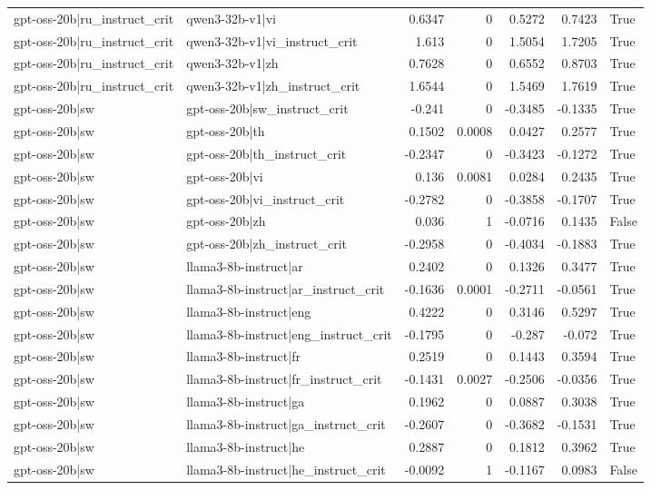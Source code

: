 \begin{table}
\begin{tabular}{l l r r r r l}
gpt-oss-20b|ru_instruct_crit & qwen3-32b-v1|vi & 0.6347 & 0 & 0.5272 & 0.7423 & True \\
gpt-oss-20b|ru_instruct_crit & qwen3-32b-v1|vi_instruct_crit & 1.613 & 0 & 1.5054 & 1.7205 & True \\
gpt-oss-20b|ru_instruct_crit & qwen3-32b-v1|zh & 0.7628 & 0 & 0.6552 & 0.8703 & True \\
gpt-oss-20b|ru_instruct_crit & qwen3-32b-v1|zh_instruct_crit & 1.6544 & 0 & 1.5469 & 1.7619 & True \\
gpt-oss-20b|sw & gpt-oss-20b|sw_instruct_crit & -0.241 & 0 & -0.3485 & -0.1335 & True \\
gpt-oss-20b|sw & gpt-oss-20b|th & 0.1502 & 0.0008 & 0.0427 & 0.2577 & True \\
gpt-oss-20b|sw & gpt-oss-20b|th_instruct_crit & -0.2347 & 0 & -0.3423 & -0.1272 & True \\
gpt-oss-20b|sw & gpt-oss-20b|vi & 0.136 & 0.0081 & 0.0284 & 0.2435 & True \\
gpt-oss-20b|sw & gpt-oss-20b|vi_instruct_crit & -0.2782 & 0 & -0.3858 & -0.1707 & True \\
gpt-oss-20b|sw & gpt-oss-20b|zh & 0.036 & 1 & -0.0716 & 0.1435 & False \\
gpt-oss-20b|sw & gpt-oss-20b|zh_instruct_crit & -0.2958 & 0 & -0.4034 & -0.1883 & True \\
gpt-oss-20b|sw & llama3-8b-instruct|ar & 0.2402 & 0 & 0.1326 & 0.3477 & True \\
gpt-oss-20b|sw & llama3-8b-instruct|ar_instruct_crit & -0.1636 & 0.0001 & -0.2711 & -0.0561 & True \\
gpt-oss-20b|sw & llama3-8b-instruct|eng & 0.4222 & 0 & 0.3146 & 0.5297 & True \\
gpt-oss-20b|sw & llama3-8b-instruct|eng_instruct_crit & -0.1795 & 0 & -0.287 & -0.072 & True \\
gpt-oss-20b|sw & llama3-8b-instruct|fr & 0.2519 & 0 & 0.1443 & 0.3594 & True \\
gpt-oss-20b|sw & llama3-8b-instruct|fr_instruct_crit & -0.1431 & 0.0027 & -0.2506 & -0.0356 & True \\
gpt-oss-20b|sw & llama3-8b-instruct|ga & 0.1962 & 0 & 0.0887 & 0.3038 & True \\
gpt-oss-20b|sw & llama3-8b-instruct|ga_instruct_crit & -0.2607 & 0 & -0.3682 & -0.1531 & True \\
gpt-oss-20b|sw & llama3-8b-instruct|he & 0.2887 & 0 & 0.1812 & 0.3962 & True \\
gpt-oss-20b|sw & llama3-8b-instruct|he_instruct_crit & -0.0092 & 1 & -0.1167 & 0.0983 & False \\

\end{tabular}
\end{table}
